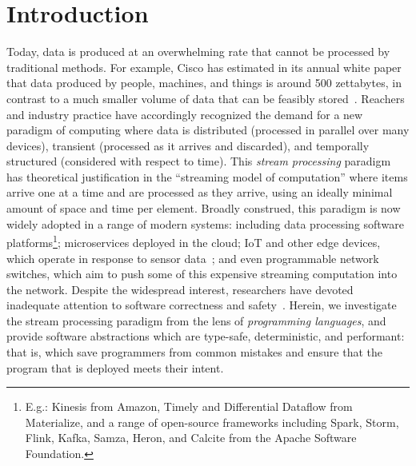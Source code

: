 \section{Introduction}
\label{sec:intro}

Today, data is produced at an overwhelming rate
that cannot be processed by traditional methods.
For example, Cisco has estimated in its annual white paper
that data produced by people, machines, and things
is around 500 zettabytes, in contrast to a much smaller volume
of data that can be feasibly stored~\cite{index2018forecast}.
Reachers and industry practice have accordingly recognized the demand
for a new paradigm of computing where data is
distributed (processed in parallel over many devices),
transient (processed as it arrives and discarded),
and temporally structured (considered with respect to time).
This \emph{stream processing} paradigm has theoretical justification in the ``streaming model of computation''
where items arrive one at a time and are processed as they arrive, using
an ideally minimal amount of space and time per element.
Broadly construed, this paradigm
is now widely adopted in a range of modern systems: including
data processing software platforms\footnote{E.g.: Kinesis from Amazon, Timely and Differential Dataflow from Materialize, and a range of open-source frameworks including Spark, Storm, Flink, Kafka, Samza, Heron, and Calcite from the Apache Software Foundation.}; microservices deployed in the cloud; IoT and other edge devices, which operate in response
to sensor data~\cite{shi2016edge, ashton2009internet}; and even programmable network switches,
which aim to push some of this expensive streaming computation
into the network.
Despite the widespread interest, researchers have devoted inadequate attention to software correctness and safety~.
Herein, we investigate the stream processing paradigm from the lens of \emph{programming languages}, and provide software abstractions which are type-safe, deterministic, and performant: that is, which save programmers from common mistakes and ensure that the program that is deployed meets their intent.





